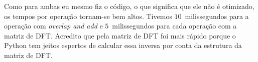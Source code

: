 \documentclass{homeworkclass}
\begin{document}
\begin{homeworkProblem}
	Como para ambas eu mesmo fiz o código, o que significa que ele não é otimizado, os tempos por operação tornam-se bem altos. Tivemos $10$~milissegundos para a operação com \textit{overlap and add} e $5$~milissegundos para cada operação com a matriz de DFT. Acredito que pela matriz de DFT foi mais rápido porque o Python tem jeitos espertos de calcular essa inversa por conta da estrutura da matriz de DFT.
\end{homeworkProblem}
\end{document}
